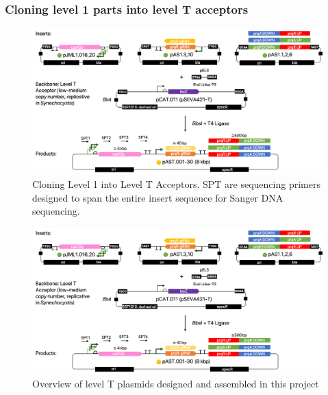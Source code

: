 \subsubsection{Cloning level 1 parts into level T acceptors}
\begin{figure}[H]
    \centering
    \includegraphics[width=\hsize]{figs/LT.png}
    \caption{Cloning Level 1 into Level T Acceptors. SPT are sequencing primers designed to span the entire insert sequence for Sanger DNA sequencing.}
\end{figure}


\begin{figure}[H]
    \centering
    \includegraphics[width=\hsize]{figs/lt.png}
    \caption{Overview of level T plasmids designed and assembled in this project}
\end{figure}

